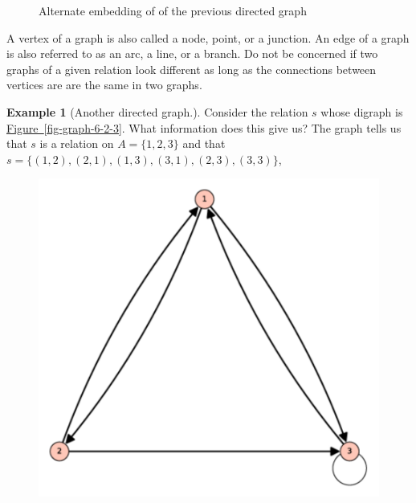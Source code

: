 \documentclass[10pt,]{book}
\theoremstyle{plain}
\theoremstyle{definition}
\theoremstyle{definition}
\theoremstyle{definition}
\newtheorem{example}[theorem]{Example}
\theoremstyle{definition}
\begin{document}
\begin{figure}
\caption{Alternate embedding of of the previous directed graph\label{fig-graph-6-2-2}}
\end{figure}
\par
A vertex of a graph is also called a node, point, or a junction. An edge of a graph is also referred to as an arc, a line, or a branch. Do not be concerned if two graphs of a given relation look different as long as the connections between vertices are are the same in two graphs.%
\begin{example}[Another directed graph.]\label{ex-another-simple-graph}
Consider the relation \(s\) whose digraph is \hyperref[fig-graph-6-2-3]{Figure~\ref{fig-graph-6-2-3}}. What information does this give us? The graph tells us that \(s\) is a relation on \(A = \{1, 2, 3\}\) and that \(s = \{(1, 2), (2, 1), (1, 3), (3, 1), (2, 3), (3, 3)\}\),%
\leavevmode%
\begin{figure}
\centering
{}%
{\includegraphics[width=1\linewidth]{images/graph-6-2-3.pdf}}%

\end{figure}
\end{example}
\end{document}
